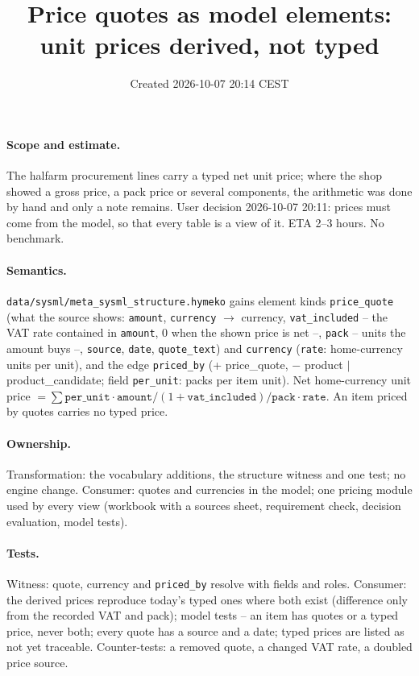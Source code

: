 \documentclass[11pt,a4paper]{article}
\title{Price quotes as model elements: unit prices derived, not typed}
\date{Created 2026-10-07 20:14 CEST}
\begin{document}
\maketitle
\paragraph{Scope and estimate.} The halfarm procurement lines carry a typed net unit price; where
the shop showed a gross price, a pack price or several components, the arithmetic was done by hand
and only a note remains. User decision 2026-10-07 20:11: prices must come from the model, so that
every table is a view of it. ETA 2--3 hours. No benchmark.
\paragraph{Semantics.} \texttt{data/sysml/meta\_sysml\_structure.hymeko} gains element kinds
\texttt{price\_quote} (what the source shows: \texttt{amount}, \texttt{currency} $\to$ currency,
\texttt{vat\_included} -- the VAT rate contained in \texttt{amount}, 0 when the shown price is net --,
\texttt{pack} -- units the amount buys --, \texttt{source}, \texttt{date}, \texttt{quote\_text}) and
\texttt{currency} (\texttt{rate}: home-currency units per unit), and the edge \texttt{priced\_by}
(+ price\_quote, $-$ product $|$ product\_candidate; field \texttt{per\_unit}: packs per item
unit). Net home-currency unit price $= \sum \texttt{per\_unit}\cdot\texttt{amount}/(1+\texttt{vat\_included})/
\texttt{pack}\cdot\texttt{rate}$. An item priced by quotes carries no typed price.
\paragraph{Ownership.} Transformation: the vocabulary additions, the structure witness and one test;
no engine change. Consumer: quotes and currencies in the model; one pricing module used by every
view (workbook with a sources sheet, requirement check, decision evaluation, model tests).
\paragraph{Tests.} Witness: quote, currency and \texttt{priced\_by} resolve with fields and roles.
Consumer: the derived prices reproduce today's typed ones where both exist (difference only from the
recorded VAT and pack); model tests -- an item has quotes or a typed price, never both; every quote has
a source and a date; typed prices are listed as not yet traceable. Counter-tests: a removed quote, a
changed VAT rate, a doubled price source.
\end{document}
